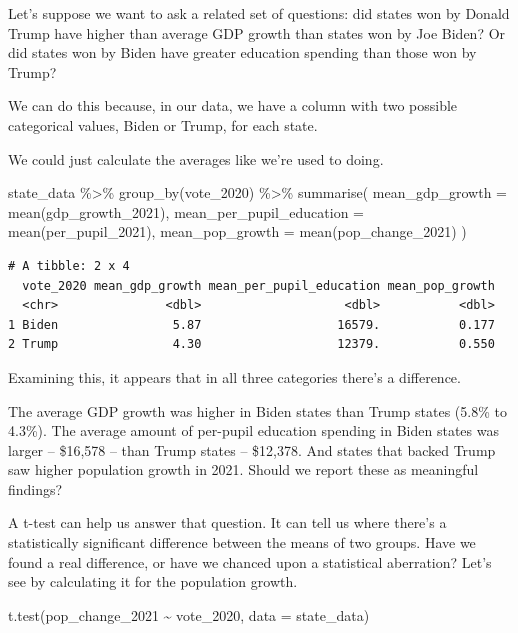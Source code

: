 \documentclass[
  letterpaper,
  DIV=11,
  numbers=noendperiod]{scrreprt}
\newenvironment{Shaded}{\begin{snugshade}}{\end{snugshade}}
\newcommand{\AttributeTok}[1]{\textcolor[rgb]{0.40,0.45,0.13}{#1}}
\newcommand{\FunctionTok}[1]{\textcolor[rgb]{0.28,0.35,0.67}{#1}}
\newcommand{\NormalTok}[1]{\textcolor[rgb]{0.00,0.23,0.31}{#1}}
\newcommand{\SpecialCharTok}[1]{\textcolor[rgb]{0.37,0.37,0.37}{#1}}
\begin{document}
Let's suppose we want to ask a related set of questions: did states won
by Donald Trump have higher than average GDP growth than states won by
Joe Biden? Or did states won by Biden have greater education spending
than those won by Trump?

We can do this because, in our data, we have a column with two possible
categorical values, Biden or Trump, for each state.

We could just calculate the averages like we're used to doing.

\begin{Shaded}
\begin{Highlighting}[]
\NormalTok{state\_data }\SpecialCharTok{\%\textgreater{}\%}
  \FunctionTok{group\_by}\NormalTok{(vote\_2020) }\SpecialCharTok{\%\textgreater{}\%}
  \FunctionTok{summarise}\NormalTok{(}
    \AttributeTok{mean\_gdp\_growth =} \FunctionTok{mean}\NormalTok{(gdp\_growth\_2021),}
    \AttributeTok{mean\_per\_pupil\_education =} \FunctionTok{mean}\NormalTok{(per\_pupil\_2021),}
    \AttributeTok{mean\_pop\_growth =} \FunctionTok{mean}\NormalTok{(pop\_change\_2021)}
\NormalTok{  )}
\end{Highlighting}
\end{Shaded}

\begin{verbatim}
# A tibble: 2 x 4
  vote_2020 mean_gdp_growth mean_per_pupil_education mean_pop_growth
  <chr>               <dbl>                    <dbl>           <dbl>
1 Biden                5.87                   16579.           0.177
2 Trump                4.30                   12379.           0.550
\end{verbatim}

Examining this, it appears that in all three categories there's a
difference.

The average GDP growth was higher in Biden states than Trump states
(5.8\% to 4.3\%). The average amount of per-pupil education spending in
Biden states was larger -- \$16,578 -- than Trump states -- \$12,378.
And states that backed Trump saw higher population growth in 2021.
Should we report these as meaningful findings?

A t-test can help us answer that question. It can tell us where there's
a statistically significant difference between the means of two groups.
Have we found a real difference, or have we chanced upon a statistical
aberration? Let's see by calculating it for the population growth.

\begin{Shaded}
\begin{Highlighting}[]
\FunctionTok{t.test}\NormalTok{(pop\_change\_2021 }\SpecialCharTok{\textasciitilde{}}\NormalTok{ vote\_2020, }\AttributeTok{data =}\NormalTok{ state\_data)}
\end{Highlighting}
\end{Shaded}
\end{document}

